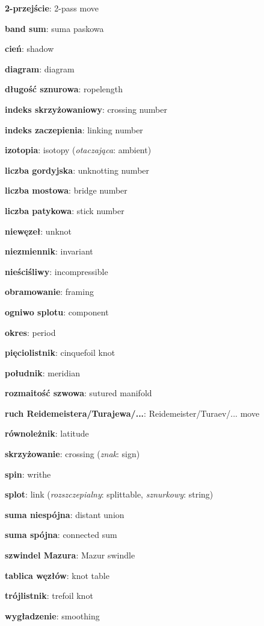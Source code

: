 \item \textbf{2-przejście}: 2-pass move
\item \textbf{band sum}: suma paskowa
\item \textbf{cień}: shadow
\item \textbf{diagram}: diagram
\item \textbf{długość sznurowa}: ropelength
\item \textbf{indeks skrzyżowaniowy}: crossing number
\item \textbf{indeks zaczepienia}: linking number
\item \textbf{izotopia}: isotopy
(\emph{otaczająca}: ambient)
\item \textbf{liczba gordyjska}: unknotting number
\item \textbf{liczba mostowa}: bridge number
\item \textbf{liczba patykowa}: stick number
\item \textbf{niewęzeł}: unknot
\item \textbf{niezmiennik}: invariant
\item \textbf{nieściśliwy}: incompressible
\item \textbf{obramowanie}: framing
\item \textbf{ogniwo splotu}: component
\item \textbf{okres}: period
\item \textbf{pięciolistnik}: cinquefoil knot
\item \textbf{południk}: meridian
\item \textbf{rozmaitość szwowa}: sutured manifold
\item \textbf{ruch Reidemeistera/Turajewa/...}: Reidemeister/Turaev/... move
\item \textbf{równoleżnik}: latitude
\item \textbf{skrzyżowanie}: crossing
(\emph{znak}: sign)
\item \textbf{spin}: writhe
\item \textbf{splot}: link
(\emph{rozszczepialny}: splittable, \emph{sznurkowy}: string)
\item \textbf{suma niespójna}: distant union
\item \textbf{suma spójna}: connected sum
\item \textbf{szwindel Mazura}: Mazur swindle
\item \textbf{tablica węzłów}: knot table
\item \textbf{trójlistnik}: trefoil knot
\item \textbf{wygładzenie}: smoothing
